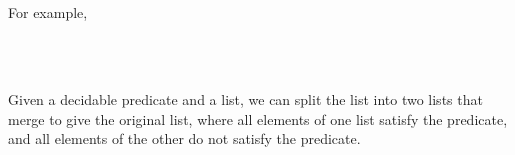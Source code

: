 \begin{fence}
\begin{code}
\>[2][@{}l@{\AgdaIndent{0}}]%
\>[4]%
\>[2179I]\AgdaSpace{}%
\AgdaSpace{}%
\AgdaSpace{}%
\<%
\\
\>[.][@{}l@{}]\<[2179I]%
\>[6]\AgdaComment{--------------------------}\<%
\\
%
\>[4]\AgdaSpace{}%
\AgdaSpace{}%
\AgdaSpace{}%
\AgdaSymbol{(}\AgdaSpace{}%
\AgdaSpace{}%
\AgdaSymbol{)}\AgdaSpace{}%
\AgdaSymbol{(}\AgdaSpace{}%
\AgdaSpace{}%
\AgdaSymbol{)}\<%
\end{code}
\end{fence}

For example,

\begin{fence}
\begin{code}%
\>[0]\AgdaFunction{\AgdaUnderscore{}}\AgdaSpace{}%
\AgdaSymbol{:}\AgdaSpace{}%
\AgdaSpace{}%
\AgdaOperator{\AgdaInductiveConstructor{[}}\AgdaSpace{}%
\AgdaSpace{}%
\AgdaOperator{\AgdaInductiveConstructor{,}}\AgdaSpace{}%
\AgdaSpace{}%
\AgdaOperator{\AgdaInductiveConstructor{]}}\AgdaSpace{}%
\AgdaOperator{\AgdaInductiveConstructor{[}}\AgdaSpace{}%
\AgdaSpace{}%
\AgdaOperator{\AgdaInductiveConstructor{,}}\AgdaSpace{}%
\AgdaSpace{}%
\AgdaOperator{\AgdaInductiveConstructor{]}}\AgdaSpace{}%
\AgdaOperator{\AgdaInductiveConstructor{[}}\AgdaSpace{}%
\AgdaSpace{}%
\AgdaOperator{\AgdaInductiveConstructor{,}}\AgdaSpace{}%
\AgdaSpace{}%
\AgdaOperator{\AgdaInductiveConstructor{,}}\AgdaSpace{}%
\AgdaSpace{}%
\AgdaOperator{\AgdaInductiveConstructor{,}}\AgdaSpace{}%
\AgdaSpace{}%
\AgdaOperator{\AgdaInductiveConstructor{]}}\<%
\\
\>[0]\AgdaSymbol{\AgdaUnderscore{}}\AgdaSpace{}%
\AgdaSymbol{=}\AgdaSpace{}%
\AgdaSpace{}%
\AgdaSymbol{(}\AgdaSpace{}%
\AgdaSymbol{(}\AgdaSpace{}%
\AgdaSymbol{(}\AgdaSpace{}%
\AgdaInductiveConstructor{[]}\AgdaSymbol{)))}\<%
\\
\>[0]\<%
\end{code}
\end{fence}

Given a decidable predicate and a list, we can split the list into two
lists that merge to give the original list, where all elements of one
list satisfy the predicate, and all elements of the other do not satisfy
the predicate.

